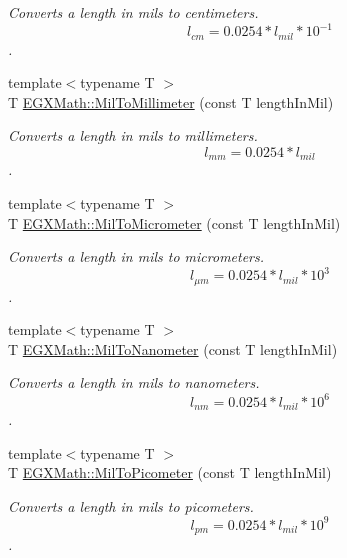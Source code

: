 \begin{DoxyCompactItemize}
\begin{DoxyCompactList}\small\item\em Converts a length in mils to centimeters. \[ l_{cm}=0.0254* l_{mil} * 10^{-1} \]. \end{DoxyCompactList}\item 
{\footnotesize template$<$typename T $>$ }\\T \mbox{\hyperlink{group___e_g_x_math-_conversions-_length_conversions-_imperial-_mil-_s_i_ga4abb75e6d0019b3a06c9912cfcdb9775}{E\+G\+X\+Math\+::\+Mil\+To\+Millimeter}} (const T length\+In\+Mil)
\begin{DoxyCompactList}\small\item\em Converts a length in mils to millimeters. \[ l_{mm}=0.0254* l_{mil} \]. \end{DoxyCompactList}\item 
{\footnotesize template$<$typename T $>$ }\\T \mbox{\hyperlink{group___e_g_x_math-_conversions-_length_conversions-_imperial-_mil-_s_i_ga696a1e5a2043b738df68bf2b9e9be4fc}{E\+G\+X\+Math\+::\+Mil\+To\+Micrometer}} (const T length\+In\+Mil)
\begin{DoxyCompactList}\small\item\em Converts a length in mils to micrometers. \[ l_{\mu m}=0.0254* l_{mil} * 10^{3} \]. \end{DoxyCompactList}\item 
{\footnotesize template$<$typename T $>$ }\\T \mbox{\hyperlink{group___e_g_x_math-_conversions-_length_conversions-_imperial-_mil-_s_i_gaf5c65c9790e4478084a2dbbc62e15d93}{E\+G\+X\+Math\+::\+Mil\+To\+Nanometer}} (const T length\+In\+Mil)
\begin{DoxyCompactList}\small\item\em Converts a length in mils to nanometers. \[ l_{nm}=0.0254* l_{mil} * 10^{6} \]. \end{DoxyCompactList}\item 
{\footnotesize template$<$typename T $>$ }\\T \mbox{\hyperlink{group___e_g_x_math-_conversions-_length_conversions-_imperial-_mil-_s_i_ga29a85f8ec2e5cf4d963468f882de8447}{E\+G\+X\+Math\+::\+Mil\+To\+Picometer}} (const T length\+In\+Mil)
\begin{DoxyCompactList}\small\item\em Converts a length in mils to picometers. \[ l_{pm}=0.0254* l_{mil} * 10^{9} \]. \end{DoxyCompactList}\item 

\end{DoxyCompactItemize}
